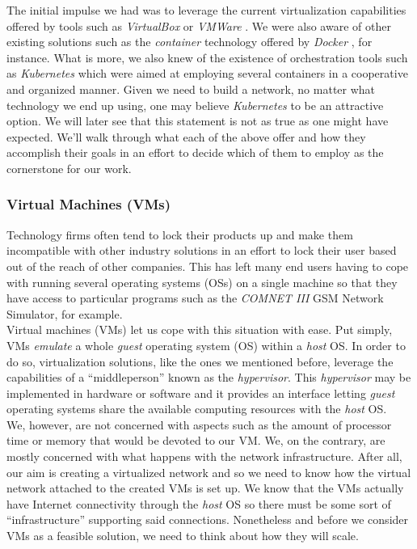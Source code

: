             The initial impulse we had was to leverage the current virtualization capabilities offered by tools such as \textit{VirtualBox} \cite{bib:virtualbox} or \textit{VMWare} \cite{bib:vmware}. We were also aware of other existing solutions such as the \textit{container} technology offered by \textit{Docker} \cite{bib:docker}, for instance. What is more, we also knew of the existence of orchestration tools such as \textit{Kubernetes} \cite{bib:kubernetes} which were aimed at employing several containers in a cooperative and organized manner. Given we need to build a network, no matter what technology we end up using, one may believe \textit{Kubernetes} to be an attractive option. We will later see that this statement is not as true as one might have expected. We'll walk through what each of the above offer and how they accomplish their goals in an effort to decide which of them to employ as the cornerstone for our work.

            \subsubsection{Virtual Machines (VMs)}
                Technology firms often tend to lock their products up and make them incompatible with other industry solutions in an effort to lock their user based out of the reach of other companies. This has left many end users having to cope with running several operating systems (OSs) on a single machine so that they have access to particular programs such as the \textit{COMNET III} GSM Network Simulator, for example.\\

                Virtual machines (VMs) let us cope with this situation with ease. Put simply, VMs \textit{emulate} a whole \textit{guest} operating system (OS) within a \textit{host} OS. In order to do so, virtualization solutions, like the ones we mentioned before, leverage the capabilities of a ``middleperson'' known as the \textit{hypervisor}. This \textit{hypervisor} may be implemented in hardware or software and it provides an interface letting \textit{guest} operating systems share the available computing resources with the \textit{host} OS.\\

                We, however, are not concerned with aspects such as the amount of processor time or memory that would be devoted to our VM. We, on the contrary, are mostly concerned with what happens with the network infrastructure. After all, our aim is creating a virtualized network and so we need to know how the virtual network attached to the created VMs is set up. We know that the VMs actually have Internet connectivity through the \textit{host} OS so there must be some sort of ``infrastructure'' supporting said connections. Nonetheless and before we consider VMs as a feasible solution, we need to think about how they will scale.\\

